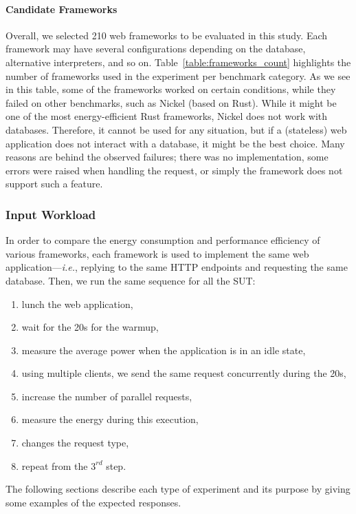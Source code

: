 \paragraph{Candidate Frameworks}

Overall, we selected 210 web frameworks to be evaluated in this study.
Each framework may have several configurations depending on the database, alternative interpreters, and so on.
Table~\ref{table:frameworks_count} highlights the number of frameworks used in the experiment per benchmark category.
As we see in this table, some of the frameworks worked on certain conditions, while they failed on other benchmarks, such as Nickel (based on Rust).
While it might be one of the most energy-efficient Rust frameworks, Nickel does not work with databases.
Therefore, it cannot be used for any situation, but if a (stateless) web application does not interact with a database, it might be the best choice.
Many reasons are behind the observed failures; there was no implementation, some errors were raised when handling the request, or simply the framework does not support such a feature.

\subsubsection{Input Workload}

In order to compare the energy consumption and performance efficiency of various frameworks, each framework is used to implement the same web application---\emph{i.e.}, replying to the same HTTP endpoints and requesting the same database. Then, we run the same sequence for all the SUT:
\begin{enumerate}
    \item lunch the web application,
    \item wait for the 20s for the warmup,
    \item measure the average power when the application is in an idle state,
    \item using multiple clients, we send the same request concurrently during the 20s,
    \item increase the number of parallel requests,
    \item measure the energy during this execution,
    \item changes the request type,
    \item repeat from the $3^{rd}$ step.
\end{enumerate}

The following sections describe each type of experiment and its purpose by giving some examples of the expected responses.


